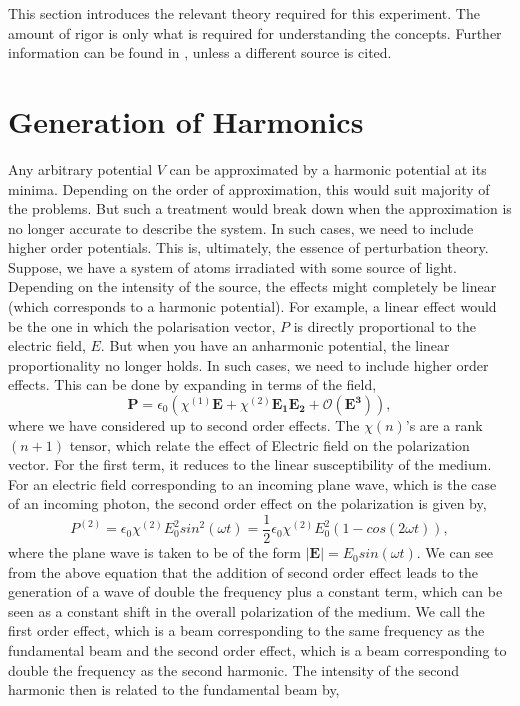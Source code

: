 This section introduces the relevant theory required for this experiment. The amount of rigor is only what is required for understanding the concepts. Further information can be found in \cite{mes}, unless a different source is cited.

\section{Generation of Harmonics}
Any arbitrary potential $V$ can be approximated by a harmonic potential at its minima. Depending on the order of approximation, this would suit majority of the problems. But such a treatment would break down when the approximation is no longer accurate to describe the system. In such cases, we need to include higher order potentials. This is, ultimately, the essence of perturbation theory. Suppose, we have a system of atoms irradiated with some source of light. Depending on the intensity of the source, the effects might completely be linear (which corresponds to a harmonic potential). For example, a linear effect would be the one in which the polarisation vector, $P$ is directly proportional to the electric field, $E$. But when you have an anharmonic potential, the linear proportionality no longer holds. In such cases, we need to include higher order effects. This can be done by expanding in terms of the field,
\begin{equation}
    \bm{P} = \epsilon_0 \left( \chi^{(1)} \bm{E} + \chi^{(2)} \bm{E_1E_2} + \mathcal{O}\bm{(E^3)} \right),
\end{equation}
where we have considered up to second order effects. The $\chi(n)$'s are a rank $(n+1)$ tensor, which relate the effect of Electric field on the polarization vector. For the first term, it reduces to the linear susceptibility of the medium. For an electric field corresponding to an incoming plane wave, which is the case of an incoming photon, the second order effect on the polarization is given by,
\begin{equation}
    P^{(2)} = \epsilon_0 \chi^{(2)} E_0^2 sin^2(\omega t) = \frac{1}{2} \epsilon_0 \chi^{(2)} E_0^2 (1 - cos(2\omega t)),
\end{equation}
where the plane wave is taken to be of the form $\lvert \bm{E} \rvert = E_0 sin(\omega t)$. We can see from the above equation that the addition of second order effect leads to the generation of a wave of double the frequency plus a constant term, which can be seen as a constant shift in the overall polarization of the medium. We call the first order effect, which is a beam corresponding to the same frequency as the fundamental beam and the second order effect, which is a beam corresponding to double the frequency as the second harmonic. The intensity of the second harmonic then is related to the fundamental beam by,

